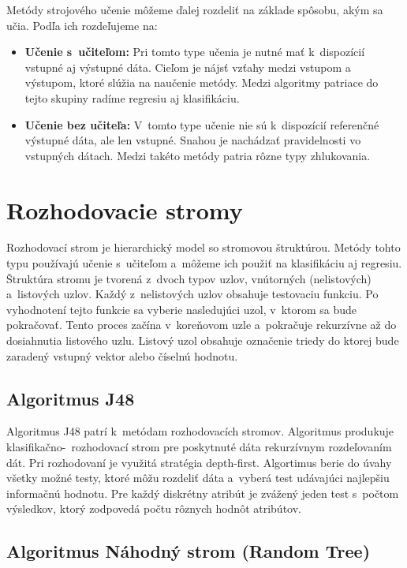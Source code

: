 \newpage
Metódy strojového učenie môžeme ďalej rozdeliť na základe spôsobu, akým sa učia. Podľa \cite{alpaydin} ich rozdeľujeme na:
\begin{itemize}
	\item \textbf{Učenie s~učiteľom:} Pri tomto type učenia je nutné mať k~dispozícií vstupné aj výstupné dáta. Cieľom je nájsť vzťahy medzi vstupom a výstupom, ktoré slúžia na naučenie metódy. Medzi algoritmy patriace do tejto skupiny radíme regresiu aj klasifikáciu.
	\item \textbf{Učenie bez učiteľa:} V~tomto type učenie nie sú k~dispozícií referenčné výstupné dáta, ale len vstupné. Snahou je nachádzať pravidelnosti vo vstupných dátach. Medzi takéto metódy patria rôzne typy zhlukovania. 
\end{itemize}

\section {Rozhodovacie stromy}
Rozhodovací strom je hierarchický model so stromovou štruktúrou. Metódy tohto typu používajú učenie s~učiteľom a~môžeme ich použiť na klasifikáciu aj regresiu. Štruktúra stromu je tvorená z~dvoch typov uzlov, vnútorných (nelistových) a~listových uzlov. Každý z~nelistových uzlov obsahuje testovaciu funkciu. Po vyhodnotení tejto funkcie sa vyberie nasledujúci uzol, v~ktorom sa bude pokračovať. Tento proces začína v~koreňovom uzle a~pokračuje rekurzívne až do dosiahnutia listového uzlu. Listový uzol obsahuje označenie triedy do ktorej bude zaradený vstupný vektor alebo číselnú hodnotu.

\subsection{Algoritmus J48}

Algoritmus J48 patrí k~metódam rozhodovacích stromov. Algoritmus produkuje klasifikačno-~rozhodovací strom pre poskytnuté dáta rekurzívnym rozdeľovaním dát. Pri rozhodovaní je využitá stratégia depth-first. Algortimus berie do úvahy všetky možné testy, ktoré môžu rozdeliť dáta a~vyberá test udávajúci najlepšiu informačnú hodnotu. Pre každý diskrétny atribút je zvážený jeden test s~počtom výsledkov, ktorý zodpovedá počtu rôznych hodnôt atribútov.  

\subsection{Algoritmus Náhodný strom (Random Tree)}

